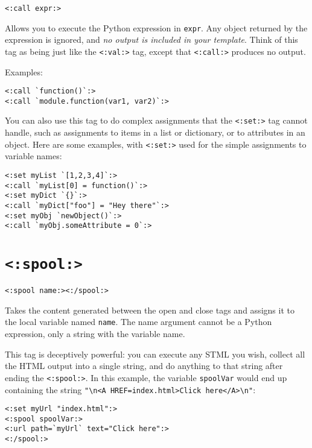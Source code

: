 \documentclass{manual}
\begin{document}
\begin{verbatim}
<:call expr:>
\end{verbatim}


Allows you to execute the Python expression in 
\texttt{expr}. Any object returned by the expression is ignored,
and \emph{no output is included in your template}. Think of this tag
as being just like the \texttt{<:val:>} tag, except that
\texttt{<:call:>} produces no output.

Examples:

\begin{verbatim}
<:call `function()`:>
<:call `module.function(var1, var2)`:>
\end{verbatim}


You can also use this tag to do complex assignments that the
\texttt{<:set:>}  tag cannot handle,
such as assignments to items in a list or dictionary, or to attributes
in an object. Here are some examples, with \texttt{<:set:>} used
for the simple assignments to variable names:

\begin{verbatim}
<:set myList `[1,2,3,4]`:>
<:call `myList[0] = function()`:>
<:set myDict `{}`:>
<:call `myDict["foo"] = "Hey there"`:>
<:set myObj `newObject()`:>
<:call `myObj.someAttribute = 0`:>
\end{verbatim}




\section{\texttt{<:spool:>}}
\label{tagspool}

\begin{verbatim}
<:spool name:><:/spool:>
\end{verbatim}

Takes the content generated between the open and close
 tags and  
assigns it to the local variable named \texttt{name}. 
The name argument cannot be a Python expression, only
a string with the variable name.

This tag is deceptively powerful: you can execute
any STML you wish, collect all the HTML output into a single
string, and do anything to that string after ending the
\texttt{<:spool:>}. In this example, the variable
\texttt{spoolVar} would end up containing the string
\verb!"\n<A HREF=index.html>Click here</A>\n"!:

\begin{verbatim}
<:set myUrl "index.html":>
<:spool spoolVar:>
<:url path=`myUrl` text="Click here":>
<:/spool:>
\end{verbatim}
\end{document}
